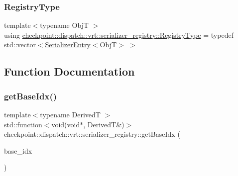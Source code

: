 \subsubsection{\texorpdfstring{Registry\+Type}{RegistryType}}
{\footnotesize\ttfamily template$<$typename ObjT $>$ \\
using \hyperlink{namespacecheckpoint_1_1dispatch_1_1vrt_1_1serializer__registry_a93af9f3c271f2e1356cdaf8944831cc3}{checkpoint\+::dispatch\+::vrt\+::serializer\+\_\+registry\+::\+Registry\+Type} = typedef std\+::vector$<$\hyperlink{structcheckpoint_1_1dispatch_1_1vrt_1_1serializer__registry_1_1_serializer_entry}{Serializer\+Entry}$<$ObjT$>$ $>$}



\subsection{Function Documentation}
\mbox{\label{namespacecheckpoint_1_1dispatch_1_1vrt_1_1serializer__registry_afa0cfe7922654b628c231e5e141ac671}} 
\subsubsection{\texorpdfstring{get\+Base\+Idx()}{getBaseIdx()}}
{\footnotesize\ttfamily template$<$typename DerivedT $>$ \\
std\+::function$<$void(void$\ast$, DerivedT\&)$>$ checkpoint\+::dispatch\+::vrt\+::serializer\+\_\+registry\+::get\+Base\+Idx (\begin{DoxyParamCaption}\item[{\hyperlink{namespacecheckpoint_1_1dispatch_1_1vrt_acd3f9e6b091bcfbc23dc35ea8ef45d3b}{Type\+Idx}}]{base\+\_\+idx }\end{DoxyParamCaption})\hspace{0.3cm}{\ttfamily [inline]}}

\mbox{\label{namespacecheckpoint_1_1dispatch_1_1vrt_1_1serializer__registry_a499ff0bece26be083fcdd66c59c79a22}} 
